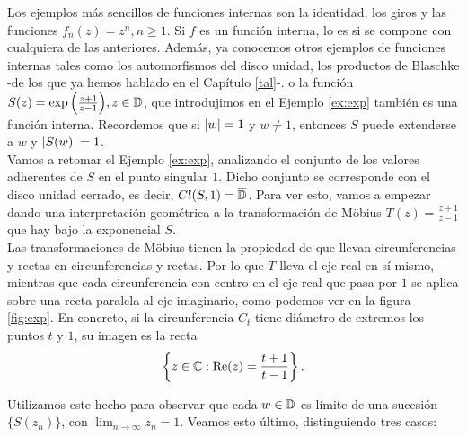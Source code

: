 \medskip

Los ejemplos más sencillos de funciones internas son la identidad, los giros y las funciones $f_n(z) = z^n, n \geq 1$. Si $f$ es un función interna, lo es si se compone con cualquiera de las anteriores.
Además, ya conocemos otros ejemplos de funciones internas tales como los automorfismos del disco unidad, los productos de Blaschke -de los que ya hemos hablado en el Capítulo \ref{tal}-. %
o la función $S(z) = \exp{\left(\frac{z + 1}{z - 1}\right)}, z \in \mathbb{D}$, que introdujimos en el Ejemplo \ref{ex:exp} también es una función interna. Recordemos que si $\left\lvert w\right\rvert = 1$ y $w \neq 1$, entonces $S$ puede extenderse a $w$ y $\left\lvert S(w)\right\rvert = 1$. \\


Vamos a retomar el Ejemplo \ref{ex:exp}, analizando el conjunto de los valores adherentes de $S$ en el punto singular $1$. Dicho conjunto se corresponde con el disco unidad cerrado, es decir, $Cl(S,1) = \overline{\mathbb{D}}$. Para ver esto, vamos a empezar dando una interpretación geométrica a la transformación de Möbius $T(z) = \frac{z + 1}{z - 1}$ que hay bajo la exponencial $S$. \\


Las transformaciones de Möbius tienen la propiedad de que llevan circunferencias y rectas en circunferencias y rectas. Por lo que $T$ lleva el eje real en sí mismo, mientras que cada circunferencia con centro en el eje real que pasa por $1$ se aplica sobre una recta paralela al eje imaginario, como podemos ver en la figura \ref{fig:exp}. En concreto, si la circunferencia $C_t$ tiene diámetro de extremos los puntos $t$ y $1$, su imagen es la recta
\begin{equation}
    \left\{z \in \mathbb{C} : \operatorname{Re}(z) = \frac{t + 1}{t - 1}\right\}.
\end{equation}

Utilizamos este hecho para observar que cada $w \in \mathbb{D}$ es límite de una sucesión $\{S(z_n)\}$, con $\lim_{n \to \infty} z_n = 1$. Veamos esto último, distinguiendo tres casos:

